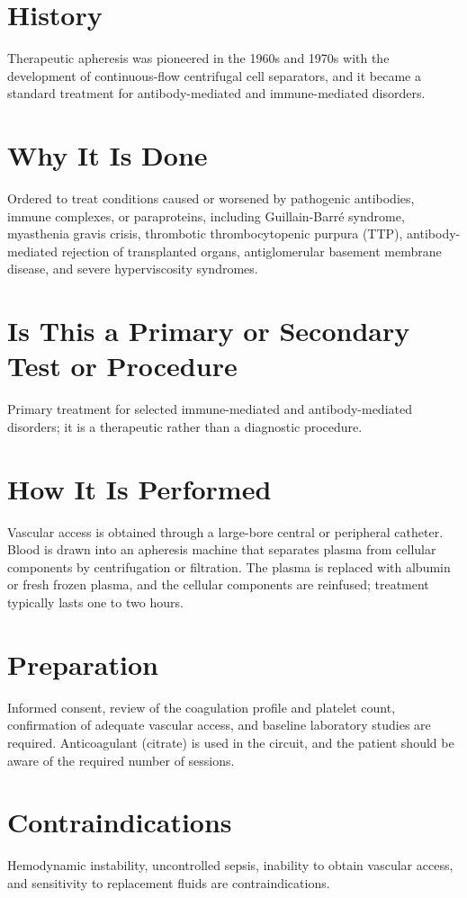 \section*{History}
Therapeutic apheresis was pioneered in the 1960s and 1970s with the development of continuous-flow centrifugal cell separators, and it became a standard treatment for antibody-mediated and immune-mediated disorders.

\section*{Why It Is Done}
Ordered to treat conditions caused or worsened by pathogenic antibodies, immune complexes, or paraproteins, including Guillain-Barr\'e syndrome, myasthenia gravis crisis, thrombotic thrombocytopenic purpura (TTP), antibody-mediated rejection of transplanted organs, antiglomerular basement membrane disease, and severe hyperviscosity syndromes.

\section*{Is This a Primary or Secondary Test or Procedure}
Primary treatment for selected immune-mediated and antibody-mediated disorders; it is a therapeutic rather than a diagnostic procedure.

\section*{How It Is Performed}
Vascular access is obtained through a large-bore central or peripheral catheter. Blood is drawn into an apheresis machine that separates plasma from cellular components by centrifugation or filtration. The plasma is replaced with albumin or fresh frozen plasma, and the cellular components are reinfused; treatment typically lasts one to two hours.

\section*{Preparation}
Informed consent, review of the coagulation profile and platelet count, confirmation of adequate vascular access, and baseline laboratory studies are required. Anticoagulant (citrate) is used in the circuit, and the patient should be aware of the required number of sessions.

\section*{Contraindications}
Hemodynamic instability, uncontrolled sepsis, inability to obtain vascular access, and sensitivity to replacement fluids are contraindications.

